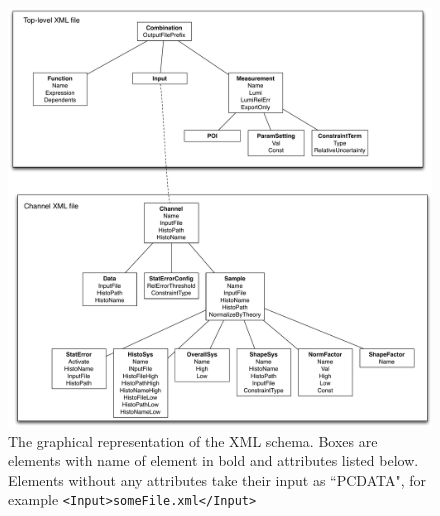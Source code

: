 \begin{figure}[h]
\begin{center}
\includegraphics[width=.8\textwidth]{figures/histfactory/XMLSchema.pdf}
\caption{The graphical representation of the XML schema.  Boxes are elements with name of element in bold and attributes listed below.  Elements without any attributes take their input as ``PCDATA", for example \texttt{<Input>someFile.xml</Input>}}
\label{fig:XML}
\end{center}
\end{figure}

